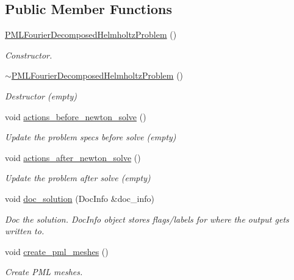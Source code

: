 \subsection*{Public Member Functions}
\begin{DoxyCompactItemize}
\item 
\hyperlink{classPMLFourierDecomposedHelmholtzProblem_a5764db8312a28a3e1eaac2cc61813f83}{P\+M\+L\+Fourier\+Decomposed\+Helmholtz\+Problem} ()
\begin{DoxyCompactList}\small\item\em Constructor. \end{DoxyCompactList}\item 
\hyperlink{classPMLFourierDecomposedHelmholtzProblem_abc35779657bcdd622d09464c225b079a}{$\sim$\+P\+M\+L\+Fourier\+Decomposed\+Helmholtz\+Problem} ()
\begin{DoxyCompactList}\small\item\em Destructor (empty) \end{DoxyCompactList}\item 
void \hyperlink{classPMLFourierDecomposedHelmholtzProblem_af87810cbe164981cc14ee779793a69fb}{actions\+\_\+before\+\_\+newton\+\_\+solve} ()
\begin{DoxyCompactList}\small\item\em Update the problem specs before solve (empty) \end{DoxyCompactList}\item 
void \hyperlink{classPMLFourierDecomposedHelmholtzProblem_a013d95d489b85e326a71bb744af4a40f}{actions\+\_\+after\+\_\+newton\+\_\+solve} ()
\begin{DoxyCompactList}\small\item\em Update the problem after solve (empty) \end{DoxyCompactList}\item 
void \hyperlink{classPMLFourierDecomposedHelmholtzProblem_afcdfaf86efc75fbea14f6ade9eeb7f9c}{doc\+\_\+solution} (Doc\+Info \&doc\+\_\+info)
\begin{DoxyCompactList}\small\item\em Doc the solution. Doc\+Info object stores flags/labels for where the output gets written to. \end{DoxyCompactList}\item 
void \hyperlink{classPMLFourierDecomposedHelmholtzProblem_ae562dddf5c60793371b594bff5047f91}{create\+\_\+pml\+\_\+meshes} ()
\begin{DoxyCompactList}\small\item\em Create P\+ML meshes. \end{DoxyCompactList}\item 

\end{DoxyCompactItemize}

